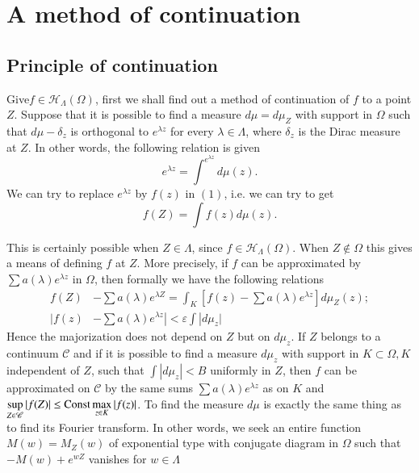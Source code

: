 
\chapter{A method of continuation}\label{chap13}

\section{Principle of continuation}\label{chap13:sec1}

Give\pageoriginale $f \in \mathscr{H}_{\Lambda}(\Omega)$, first we shall find out a
method of continuation of $f$ to a point $Z$. Suppose that it is
possible to find a measure $d \mu = d \mu_Z$ with support in $\Omega$
such that $d \mu - \delta_z$ is orthogonal to $e^{\lambda z}$ for
every $\lambda \in \Lambda$, where $\delta_z$ is the Dirac measure at
$Z$. In other words, the following relation is given 
\begin{equation*}
  e^{\lambda z} = \int^{e^{\lambda z}} d \mu(z).\tag{1}\label{chap13:sec1:eq1}
\end{equation*}
We can try to replace $e^{\lambda z}$ by $f(z)$ in $(1)$, i.e. we can try to get 
\begin{equation*}
  f(Z) = \int f(z) d \mu (z). \tag{2}\label{chap13:sec1:eq2}
\end{equation*}

This is certainly possible when $Z \in \Lambda$, since $f \in
\mathscr{H}_{\Lambda}(\Omega)$. When $Z \notin \Omega$ this gives a
means of defining $f$ at $Z$. More precisely, if $f$ can be
approximated by $\sum a (\lambda) e^{\lambda z}$ in $\Omega$, then
formally we have the following relations 
\begin{align*}
 f(Z) & - \sum a (\lambda) e^{\lambda Z} = \int_K [ f(z) - \sum a
 (\lambda) e^{\lambda z}] d \mu_Z(z); \\ 
 |f(z) & - \sum a (\lambda) e^{\lambda z}| < \varepsilon \int | d \mu_z|
\end{align*}
Hence the majorization does not depend on $Z$ but on $d \mu_z$. If $Z$
belongs to a continuum $\mathscr{C}$ and if it is possible to
find a measure $d \mu_z$ with support in $K \subset \Omega, K$
independent of $Z$, such that $\int |d \mu_z| < B$ uniformly in $Z$,
then $f$ can be approximated on $\mathscr{C}$ by the same sums $\sum
a(\lambda)e^{\lambda z}$ as on $K$ and $\sup \limits_{Z \in
 \mathscr{C}} |f(Z)| \le \operatorname{Const} \max \limits_{z \in K}|f (z)|$. To
find the measure $d \mu$ is exactly the same thing as to find its
Fourier transform. In other words, we seek an entire function $M(w) =
M_Z(w)$ of exponential type with conjugate diagram in $\Omega$ such
that $- M(w) + e^{wZ}$ vanishes for $w \in \Lambda$ 

